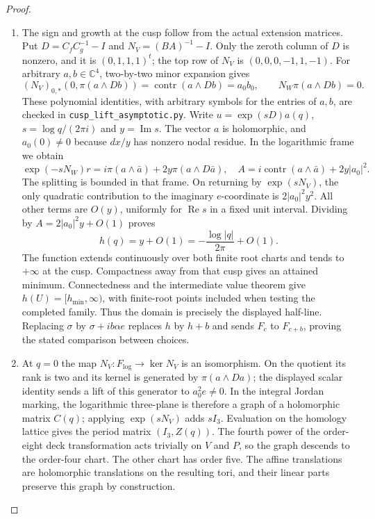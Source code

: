 \begin{proof}
\begin{enumerate}[label=\arabic*.]
\item The sign and growth at the cusp follow from the actual extension
matrices.  Put $D=C_fC_g^{-1}-I$ and $N_V=(BA)^{-1}-I$.
Only the zeroth column of $D$ is nonzero, and it is $(0,1,1,1)^t$;
the top row of $N_V$ is $(0,0,0,-1,1,-1)$.
For arbitrary $a,b\in\mathbb C^4$, two-by-two minor expansion gives
\[
(N_V)_{0,*}(0,\pi(a\wedge Db))
 =\operatorname{contr}(a\wedge Db)=a_0b_0,
 \qquad N_W\pi(a\wedge Db)=0.
\]
These polynomial identities, with arbitrary symbols for the entries of
$a,b$, are checked in \texttt{cusp\_lift\_asymptotic.py}.
Write $u=\exp(sD)a(q)$, $s=\log q/(2\pi i)$ and $y=\operatorname{Im}s$.
The vector $a$ is holomorphic, and $a_0(0)\ne0$ because $dx/y$ has
nonzero nodal residue.  In the logarithmic frame we obtain
\[
\exp(-sN_W)r=i\pi(a\wedge\bar a)+2y\pi(a\wedge D\bar a),
\quad
A=i\operatorname{contr}(a\wedge\bar a)+2y|a_0|^2.
\]
The splitting is bounded in that frame.  On returning by
$\exp(sN_V)$, the only quadratic contribution to the imaginary
$e$-coordinate is $2|a_0|^2y^2$.  All other terms are $O(y)$,
uniformly for $\operatorname{Re}s$ in a fixed unit interval.
Dividing by $A=2|a_0|^2y+O(1)$ proves
\[
h(q)=y+O(1)=-\frac{\log|q|}{2\pi}+O(1).
\]
The function extends continuously over both finite root charts and
tends to $+\infty$ at the cusp.  Compactness away from that cusp gives
an attained minimum.  Connectedness and the intermediate value
theorem give $h(U)=[h_{\min},\infty)$, with finite-root points included
when testing the completed family.  Thus the domain is precisely the
displayed half-line.  Replacing $\sigma$ by $\sigma+ib\alpha e$ replaces
$h$ by $h+b$ and sends $F_c$ to $F_{c+b}$, proving the stated
comparison between choices.

\item At $q=0$ the map $N_V:F_{\log}\to\ker N_V$ is an isomorphism.
On the quotient its rank is two and its kernel is generated by
$\pi(a\wedge Da)$; the displayed scalar identity sends a lift of this
generator to $a_0^2e\ne0$.  In the integral Jordan marking, the
logarithmic three-plane is therefore a graph of a holomorphic matrix
$C(q)$; applying $\exp(sN_V)$ adds $sI_3$.  Evaluation on the homology
lattice gives the period matrix $(I_3,Z(q))$.
The fourth power of the order-eight deck transformation acts trivially
on $V$ and $P$, so the graph descends to the order-four chart.
The other chart has order five.  The affine translations are
holomorphic translations on the resulting tori, and their linear
parts preserve this graph by construction.

\end{enumerate}
\end{proof}


